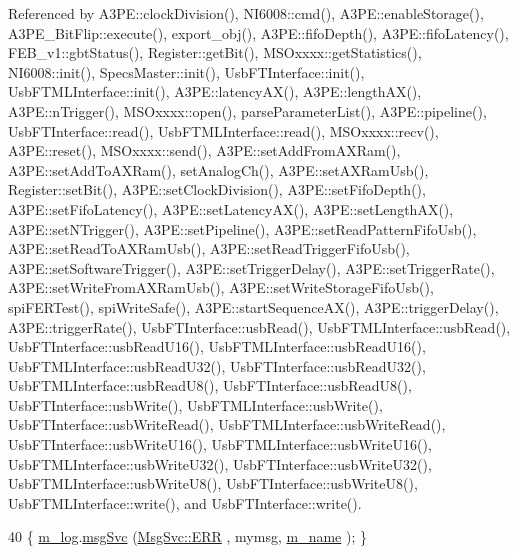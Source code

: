 Referenced by A3\+P\+E\+::clock\+Division(), N\+I6008\+::cmd(), A3\+P\+E\+::enable\+Storage(), A3\+P\+E\+\_\+\+Bit\+Flip\+::execute(), export\+\_\+obj(), A3\+P\+E\+::fifo\+Depth(), A3\+P\+E\+::fifo\+Latency(), F\+E\+B\+\_\+v1\+::gbt\+Status(), Register\+::get\+Bit(), M\+S\+Oxxxx\+::get\+Statistics(), N\+I6008\+::init(), Specs\+Master\+::init(), Usb\+F\+T\+Interface\+::init(), Usb\+F\+T\+M\+L\+Interface\+::init(), A3\+P\+E\+::latency\+A\+X(), A3\+P\+E\+::length\+A\+X(), A3\+P\+E\+::n\+Trigger(), M\+S\+Oxxxx\+::open(), parse\+Parameter\+List(), A3\+P\+E\+::pipeline(), Usb\+F\+T\+Interface\+::read(), Usb\+F\+T\+M\+L\+Interface\+::read(), M\+S\+Oxxxx\+::recv(), A3\+P\+E\+::reset(), M\+S\+Oxxxx\+::send(), A3\+P\+E\+::set\+Add\+From\+A\+X\+Ram(), A3\+P\+E\+::set\+Add\+To\+A\+X\+Ram(), set\+Analog\+Ch(), A3\+P\+E\+::set\+A\+X\+Ram\+Usb(), Register\+::set\+Bit(), A3\+P\+E\+::set\+Clock\+Division(), A3\+P\+E\+::set\+Fifo\+Depth(), A3\+P\+E\+::set\+Fifo\+Latency(), A3\+P\+E\+::set\+Latency\+A\+X(), A3\+P\+E\+::set\+Length\+A\+X(), A3\+P\+E\+::set\+N\+Trigger(), A3\+P\+E\+::set\+Pipeline(), A3\+P\+E\+::set\+Read\+Pattern\+Fifo\+Usb(), A3\+P\+E\+::set\+Read\+To\+A\+X\+Ram\+Usb(), A3\+P\+E\+::set\+Read\+Trigger\+Fifo\+Usb(), A3\+P\+E\+::set\+Software\+Trigger(), A3\+P\+E\+::set\+Trigger\+Delay(), A3\+P\+E\+::set\+Trigger\+Rate(), A3\+P\+E\+::set\+Write\+From\+A\+X\+Ram\+Usb(), A3\+P\+E\+::set\+Write\+Storage\+Fifo\+Usb(), spi\+F\+E\+R\+Test(), spi\+Write\+Safe(), A3\+P\+E\+::start\+Sequence\+A\+X(), A3\+P\+E\+::trigger\+Delay(), A3\+P\+E\+::trigger\+Rate(), Usb\+F\+T\+Interface\+::usb\+Read(), Usb\+F\+T\+M\+L\+Interface\+::usb\+Read(), Usb\+F\+T\+Interface\+::usb\+Read\+U16(), Usb\+F\+T\+M\+L\+Interface\+::usb\+Read\+U16(), Usb\+F\+T\+M\+L\+Interface\+::usb\+Read\+U32(), Usb\+F\+T\+Interface\+::usb\+Read\+U32(), Usb\+F\+T\+M\+L\+Interface\+::usb\+Read\+U8(), Usb\+F\+T\+Interface\+::usb\+Read\+U8(), Usb\+F\+T\+Interface\+::usb\+Write(), Usb\+F\+T\+M\+L\+Interface\+::usb\+Write(), Usb\+F\+T\+Interface\+::usb\+Write\+Read(), Usb\+F\+T\+M\+L\+Interface\+::usb\+Write\+Read(), Usb\+F\+T\+Interface\+::usb\+Write\+U16(), Usb\+F\+T\+M\+L\+Interface\+::usb\+Write\+U16(), Usb\+F\+T\+M\+L\+Interface\+::usb\+Write\+U32(), Usb\+F\+T\+Interface\+::usb\+Write\+U32(), Usb\+F\+T\+M\+L\+Interface\+::usb\+Write\+U8(), Usb\+F\+T\+Interface\+::usb\+Write\+U8(), Usb\+F\+T\+M\+L\+Interface\+::write(), and Usb\+F\+T\+Interface\+::write().


\begin{DoxyCode}
40 \{ \hyperlink{classObject_a0d269813dd7ac1f24bc143031e2963f2}{m\_log}.\hyperlink{classMsgSvc_ad25f18047920cc59a314e5098259711c}{msgSvc} (\hyperlink{classMsgSvc_ae671eb7301996cd049d2da8a65925926a35a9d7166e9896af4ec8fb33bf5f1772}{MsgSvc::ERR}     , mymsg, \hyperlink{classObject_a8b83c95c705d2c3ba0d081fe1710f48d}{m\_name} ); \}
\end{DoxyCode}
\mbox{\label{classObject_ad7f6c457733082efa2f9ff5f5c8e119a}} 
